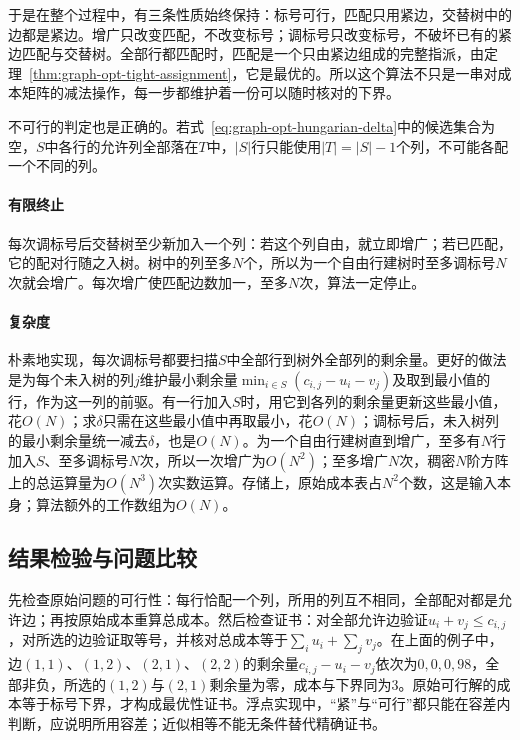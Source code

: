 于是在整个过程中，有三条性质始终保持：标号可行，匹配只用紧边，交替树中的边都是紧边。增广只改变匹配，不改变标号；调标号只改变标号，不破坏已有的紧边匹配与交替树。全部行都匹配时，匹配是一个只由紧边组成的完整指派，由定理~\ref{thm:graph-opt-tight-assignment}，它是最优的。所以这个算法不只是一串对成本矩阵的减法操作，每一步都维护着一份可以随时核对的下界。

不可行的判定也是正确的。若式~\eqref{eq:graph-opt-hungarian-delta}中的候选集合为空，$S$中各行的允许列全部落在$T$中，$|S|$行只能使用$|T|=|S|-1$个列，不可能各配一个不同的列。

\paragraph{有限终止}
每次调标号后交替树至少新加入一个列：若这个列自由，就立即增广；若已匹配，它的配对行随之入树。树中的列至多$N$个，所以为一个自由行建树时至多调标号$N$次就会增广。每次增广使匹配边数加一，至多$N$次，算法一定停止。

\paragraph{复杂度}
朴素地实现，每次调标号都要扫描$S$中全部行到树外全部列的剩余量。更好的做法是为每个未入树的列$j$维护最小剩余量$\min_{i\in S}(c_{i,j}-u_i-v_j)$及取到最小值的行，作为这一列的前驱。有一行加入$S$时，用它到各列的剩余量更新这些最小值，花$O(N)$；求$\delta$只需在这些最小值中再取最小，花$O(N)$；调标号后，未入树列的最小剩余量统一减去$\delta$，也是$O(N)$。为一个自由行建树直到增广，至多有$N$行加入$S$、至多调标号$N$次，所以一次增广为$O(N^2)$；至多增广$N$次，稠密$N$阶方阵上的总运算量为$O(N^3)$次实数运算。存储上，原始成本表占$N^2$个数，这是输入本身；算法额外的工作数组为$O(N)$。

\subsection{结果检验与问题比较}
\label{sec:graph-opt-assign-analysis}

先检查原始问题的可行性：每行恰配一个列，所用的列互不相同，全部配对都是允许边；再按原始成本重算总成本。然后检查证书：对全部允许边验证$u_i+v_j\leq c_{i,j}$，对所选的边验证取等号，并核对总成本等于$\sum_iu_i+\sum_jv_j$。在上面的例子中，边$(1,1)$、$(1,2)$、$(2,1)$、$(2,2)$的剩余量$c_{i,j}-u_i-v_j$依次为$0,0,0,98$，全部非负，所选的$(1,2)$与$(2,1)$剩余量为零，成本与下界同为$3$。原始可行解的成本等于标号下界，才构成最优性证书。浮点实现中，“紧”与“可行”都只能在容差内判断，应说明所用容差；近似相等不能无条件替代精确证书。

